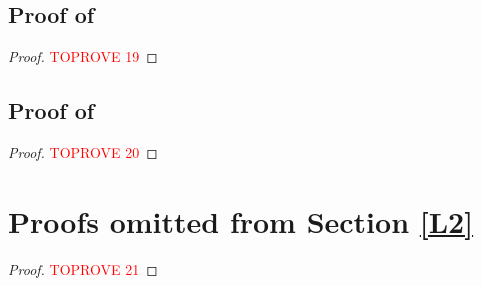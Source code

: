 \documentclass[11pt, a4paper, twoside]{article}
\numberwithin{equation}{section}
\begin{document}
	\subsection{Proof of }\label{supphardsecretaryGdhorizon}
	\begin{proof}\textcolor{red}{TOPROVE 19}\end{proof}

	\subsection{Proof of }\label{supphardsecretaryfuture}
    	\begin{proof}\textcolor{red}{TOPROVE 20}\end{proof}
	
	\section{Proofs omitted from Section \ref{L2}}\label{suppL2}
	\begin{proof}\textcolor{red}{TOPROVE 21}\end{proof}
\end{document}

